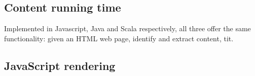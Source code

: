 


\subsection{Content running time}

Implemented in Javascript, Java and Scala respectively, all three offer the same functionality: given an HTML web page, identify and extract content, tit.





\subsection{JavaScript rendering}






